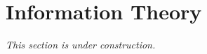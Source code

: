 \section{Information Theory}
\label{sec:information-theory}

\emph{This section is under construction.}
